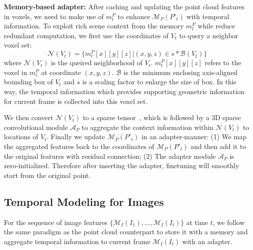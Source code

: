 \textbf{Memory-based adapter:}
After caching and updating the point cloud features in voxels, we need to make use of $m^P_{t}$ to enhance $\mathcal{M}_{P}(P'_t)$ with temporal information.
To exploit rich scene context from the memory $m^P_t$ while reduce redundant computation, we first use the coordinates of $V_t$ to query a neighbor voxel set:
\begin{equation}
    \mathcal{N}(V_t)=\{m^P_t[x][y][z]|(x,y,z)\in s*\mathcal{B}(V_t)\}
\end{equation}
where $\mathcal{N}(V_t)$ is the queired neighborhood of $V_t$. $m^P_t[x][y][z]$ refers to the voxel in $m^P_t$ at coordinate $(x,y,z)$. $\mathcal{B}$ is the minimum enclosing axis-aligned bounding box of $V_t$ and $s$ is a scaling factor to enlarge the size of box. In this way, the temporal information which provides supporting geometric information for current frame is collected into this voxel set. 

We then convert $\mathcal{N}(V_t)$ to a sparse tensor~\cite{graham20183d,choy20194d}, which is followed by a 3D sparse convolutional module $\mathcal{A}_P$ to aggregate the context information within $\mathcal{N}(V_t)$ to locations of $V_t$.
Finally we update $\mathcal{M}_{P}(P'_t)$ in an adapter-manner: (1) We map the aggregated features back to the coordinates of $\mathcal{M}_{P}(P'_t)$ and then add it to the original features with residual connection; (2) The adapter module $\mathcal{A}_P$ is zero-initialized. Therefore after inserting the adapter, finetuning will smoothly start from the original point.


\subsection{Temporal Modeling for Images}
For the sequence of image features $\{\mathcal{M}_{I}(I_1),...,\mathcal{M}_{I}(I_t)\}$ at time $t$, we follow the same paradigm as the point cloud counterpart to store it with a memory and aggregate temporal information to current frame $\mathcal{M}_{I}(I_t)$ with an adapter.

